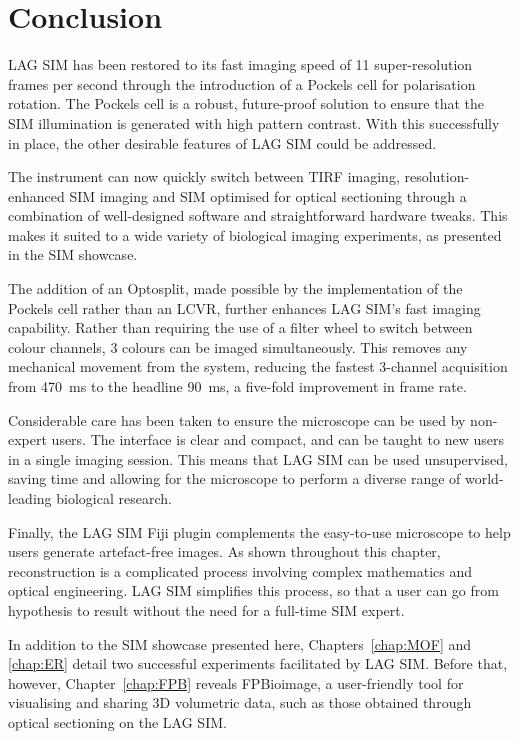 \section{Conclusion}
LAG SIM has been restored to its fast imaging speed of 11 super-resolution frames per second through the introduction of a Pockels cell for polarisation rotation. 
The Pockels cell is a robust, future-proof solution to ensure that the SIM illumination is generated with high pattern contrast. 
With this successfully in place, the other desirable features of LAG SIM could be addressed. 

The instrument can now quickly switch between TIRF imaging, resolution-enhanced SIM imaging and SIM optimised for optical sectioning through a combination of well-designed software and straightforward hardware tweaks. 
This makes it suited to a wide variety of biological imaging experiments, as presented in the SIM showcase. 

The addition of an Optosplit, made possible by the implementation of the Pockels cell rather than an LCVR, further enhances LAG SIM's fast imaging capability. 
Rather than requiring the use of a filter wheel to switch between colour channels, 3 colours can be imaged simultaneously. 
This removes any mechanical movement from the system, reducing the fastest 3-channel acquisition from \SI{470}{\milli\second} to the headline \SI{90}{\milli\second}, a five-fold improvement in frame rate. 

Considerable care has been taken to ensure the microscope can be used by non-expert users. 
The interface is clear and compact, and can be taught to new users in a single imaging session. 
This means that LAG SIM can be used unsupervised, saving time and allowing for the microscope to perform a diverse range of world-leading biological research.

Finally, the LAG SIM Fiji plugin complements the easy-to-use microscope to help users generate artefact-free images. 
As shown throughout this chapter, reconstruction is a complicated process involving complex mathematics and optical engineering. 
LAG SIM simplifies this process, so that a user can go from hypothesis to result without the need for a full-time SIM expert. 

In addition to the SIM showcase presented here, Chapters~\ref{chap:MOF} and \ref{chap:ER} detail two successful experiments facilitated by LAG SIM. 
Before that, however, Chapter~\ref{chap:FPB} reveals FPBioimage, a user-friendly tool for visualising and sharing 3D volumetric data, such as those obtained through optical sectioning on the LAG SIM. 